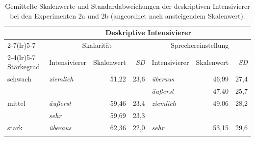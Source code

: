 \begin{table}
\small
\begin{tabularx}{\textwidth}{X@{} lrr lrr }
\lsptoprule
 &  \multicolumn{6}{c}{\textbf{Deskriptive Intensivierer}}  \\
\cmidrule(lr){2-7}\cmidrule(lr){5-7}
& \multicolumn{3}{c}{{Skalarität}} & \multicolumn{3}{c}{{Sprechereinstellung}}  \\
\cmidrule(lr){2-4}\cmidrule(lr){5-7}
{Stärkegrad}  & Intensivierer & Skalenwert& \textit{SD}  & Intensivierer & Skalenwert& \textit{SD}   \\
\midrule
schwach & \textit{ziemlich} & 51,22& 23,6 & \textit{überaus} & 46,99 & 27,4  \\
 & & &  &    \textit{äußerst} & 47,40& 25,7 \\
mittel & \textit{äußerst} & 59,46& 23,4  & \textit{ziemlich} & 49,06& 28,2 \\
 & \textit{sehr} & 59,69& 23,3 &  & \\
stark & \textit{überaus} & 62,36& 22,0 & \textit{sehr} & 53,15 & 29,6 \\
\lspbottomrule
\end{tabularx}
\caption[Gemittelte Skalenwerte und Standardabweichungen der deskriptiven Intensivierer bei den {Experimenten 2a und 2b}]{Gemittelte Skalenwerte und Standardabweichungen der deskriptiven Intensivierer bei den Experimenten 2a und 2b (angeordnet nach ansteigendem Skalenwert).}
\label{deIn}
\end{table}

